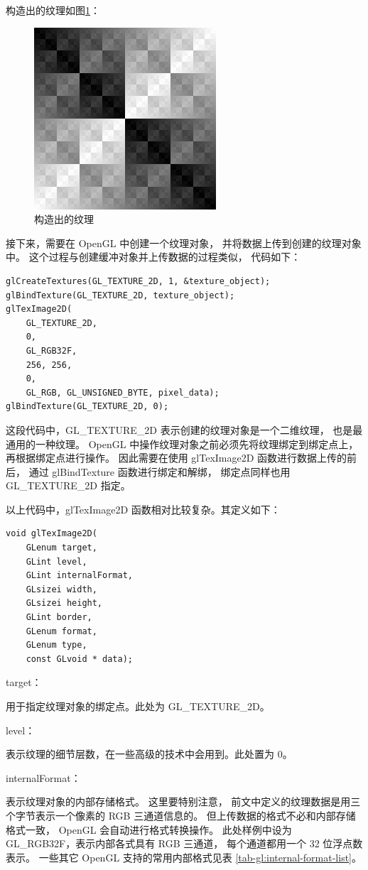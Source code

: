 \documentclass[fontset=windows]{ctexart}
\begin{document}
构造出的纹理如图\ref{fig-gl:texture}：
\begin{figure}[htbp]
\centering
\includegraphics[width=0.35\linewidth]{imgs/sec 5.1/texture.png}
\caption{构造出的纹理}
\label{fig-gl:texture}
\end{figure}

接下来，需要在 OpenGL 中创建一个纹理对象，
并将数据上传到创建的纹理对象中。
这个过程与创建缓冲对象并上传数据的过程类似，
代码如下：

\begin{lstlisting}
glCreateTextures(GL_TEXTURE_2D, 1, &texture_object);
glBindTexture(GL_TEXTURE_2D, texture_object);
glTexImage2D(
    GL_TEXTURE_2D,
    0,
    GL_RGB32F,
    256, 256,
    0,
    GL_RGB, GL_UNSIGNED_BYTE, pixel_data);
glBindTexture(GL_TEXTURE_2D, 0);
\end{lstlisting}

这段代码中，GL\_TEXTURE\_2D 表示创建的纹理对象是一个二维纹理，
也是最通用的一种纹理。
OpenGL 中操作纹理对象之前必须先将纹理绑定到绑定点上，
再根据绑定点进行操作。
因此需要在使用 glTexImage2D 函数进行数据上传的前后，
通过 glBindTexture 函数进行绑定和解绑，
绑定点同样也用 GL\_TEXTURE\_2D 指定。

以上代码中，glTexImage2D 函数相对比较复杂。其定义如下：

\begin{lstlisting}
void glTexImage2D(
    GLenum target,
    GLint level,
    GLint internalFormat,
    GLsizei width,
    GLsizei height,
    GLint border,
    GLenum format,
    GLenum type,
    const GLvoid * data);
\end{lstlisting}

target：

用于指定纹理对象的绑定点。此处为 GL\_TEXTURE\_2D。

level：

表示纹理的细节层数，在一些高级的技术中会用到。此处置为 0。

internalFormat：

表示纹理对象的内部存储格式。
这里要特别注意，
前文中定义的纹理数据是用三个字节表示一个像素的 RGB 三通道信息的。
但上传数据的格式不必和内部存储格式一致，
OpenGL 会自动进行格式转换操作。
此处样例中设为 GL\_RGB32F，表示内部各式具有 RGB 三通道，
每个通道都用一个 32 位浮点数表示。
一些其它 OpenGL 支持的常用内部格式见表 \ref{tab-gl:internal-format-list}。
\end{document}
